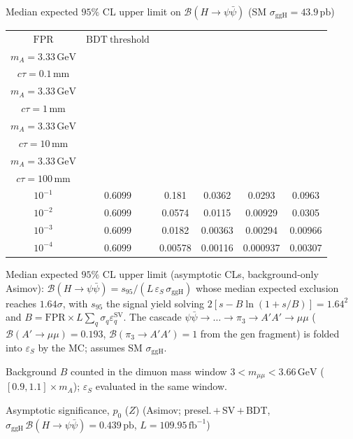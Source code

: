 \documentclass[10pt,a4paper]{article}
\begin{document}
{\vspace{12pt}

Median expected $95\%$ CL upper limit on $\mathcal{B}(H\to\psi\bar{\psi})$ (SM $\sigma_{\mathrm{ggH}}=43.9\,\mathrm{pb}$)

\begin{tabular}{cccccc}
\toprule
$\mathrm{FPR}$ & $\mathrm{BDT\ threshold}$ & \shortstack{$m_{\pi}=10\,\mathrm{GeV}$\\$m_{A}=3.33\,\mathrm{GeV}$\\$c\tau=0.1\,\mathrm{mm}$} & \shortstack{$m_{\pi}=10\,\mathrm{GeV}$\\$m_{A}=3.33\,\mathrm{GeV}$\\$c\tau=1\,\mathrm{mm}$} & \shortstack{$m_{\pi}=10\,\mathrm{GeV}$\\$m_{A}=3.33\,\mathrm{GeV}$\\$c\tau=10\,\mathrm{mm}$} & \shortstack{$m_{\pi}=10\,\mathrm{GeV}$\\$m_{A}=3.33\,\mathrm{GeV}$\\$c\tau=100\,\mathrm{mm}$} \\
\midrule
$10^{-1}$ & $0.6099$ & 0.181 & 0.0362 & 0.0293 & 0.0963\\
$10^{-2}$ & $0.6099$ & 0.0574 & 0.0115 & 0.00929 & 0.0305\\
$10^{-3}$ & $0.6099$ & 0.0182 & 0.00363 & 0.00294 & 0.00966\\
$10^{-4}$ & $0.6099$ & 0.00578 & 0.00116 & 0.000937 & 0.00307\\
\bottomrule
\end{tabular}

{\small Median expected $95\%$ CL upper limit (asymptotic CLs, background-only Asimov): $\mathcal{B}(H\to\psi\bar{\psi})=s_{95}/(L\,\varepsilon_S\,\sigma_{\mathrm{ggH}})$ whose median expected exclusion reaches $1.64\sigma$, with $s_{95}$ the signal yield solving $2[s-B\ln(1{+}s/B)]=1.64^2$ and $B=\mathrm{FPR}\times L\sum_q\sigma_q\varepsilon_q^{\mathrm{SV}}$. The cascade $\psi\bar{\psi}\to\ldots\to\pi_3\to A'A'\to\mu\mu$ ($\mathcal{B}(A'\to\mu\mu)=0.193$, $\mathcal{B}(\pi_3\to A'A')=1$ from the gen fragment) is folded into $\varepsilon_S$ by the MC; assumes SM $\sigma_{\mathrm{ggH}}$.}

{\small Background $B$ counted in the dimuon mass window $3<m_{\mu\mu}<3.66\,\mathrm{GeV}$ ($[0.9,1.1]\times m_A$); $\varepsilon_S$ evaluated in the same window.}

\vspace{12pt}

Asymptotic significance, $p_0$ ($Z$) (Asimov; presel.\,$+$\,SV\,$+$\,BDT, $\sigma_{\mathrm{ggH}}\,\mathcal{B}(H\to\psi\bar{\psi})=0.439\,\mathrm{pb}$, $L=109.95\,\mathrm{fb}^{-1}$)

}
\end{document}
